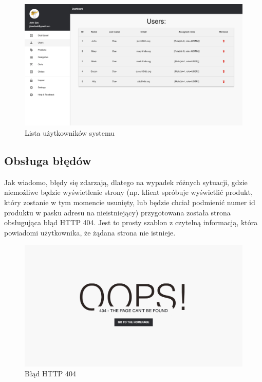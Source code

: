 \documentclass[12pt,a4paper,titlepage]{article}
\begin{document}
\begin{figure}[H]
    \centering
    \includegraphics[width=15cm]{Pics/adminPanel3.png}
    \caption{Lista użytkowników systemu}
    \label{pic:adminPanel3}
\end{figure}

\subsection{Obsługa błędów}
Jak wiadomo, błędy się zdarzają, dlatego na wypadek różnych sytuacji, gdzie niemożliwe będzie wyświetlenie strony (np. klient spróbuje wyświetlić produkt, który zostanie w tym momencie usunięty, lub będzie chciał podmienić numer id produktu w pasku adresu na nieistniejący) przygotowana została strona obsługująca błąd HTTP 404. Jest to prosty szablon z czytelną informacją, która powiadomi użytkownika, że żądana strona nie istnieje.
\begin{figure}[H]
    \centering
    \includegraphics[width=15cm]{Pics/404.png}
    \caption{Błąd HTTP 404}
    \label{pic:404}
\end{figure}
\end{document}
